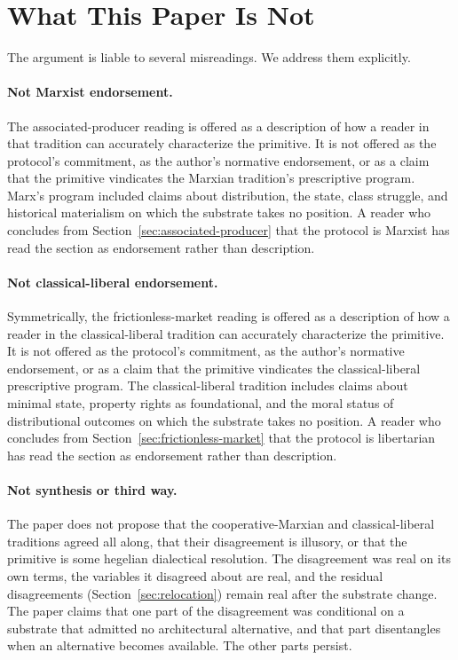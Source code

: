 \documentclass[11pt,a4paper]{article}
\theoremstyle{remark}
\begin{document}
\section{What This Paper Is Not}
\label{sec:not}

The argument is liable to several misreadings. We address them
explicitly.

\paragraph{Not Marxist endorsement.}
The associated-producer reading is offered as a description of
how a reader in that tradition can accurately characterize the
primitive. It is not offered as the protocol's commitment, as
the author's normative endorsement, or as a claim that the
primitive vindicates the Marxian tradition's prescriptive
program. Marx's program included claims about distribution, the
state, class struggle, and historical materialism on which the
substrate takes no position. A reader who concludes from
Section~\ref{sec:associated-producer} that the protocol is
Marxist has read the section as endorsement rather than
description.

\paragraph{Not classical-liberal endorsement.}
Symmetrically, the frictionless-market reading is offered as a
description of how a reader in the classical-liberal tradition
can accurately characterize the primitive. It is not offered as
the protocol's commitment, as the author's normative endorsement,
or as a claim that the primitive vindicates the classical-liberal
prescriptive program. The classical-liberal tradition includes
claims about minimal state, property rights as foundational, and
the moral status of distributional outcomes on which the
substrate takes no position. A reader who concludes from
Section~\ref{sec:frictionless-market} that the protocol is
libertarian has read the section as endorsement rather than
description.

\paragraph{Not synthesis or third way.}
The paper does not propose that the cooperative-Marxian and
classical-liberal traditions agreed all along, that their
disagreement is illusory, or that the primitive is some
hegelian dialectical resolution. The disagreement was real on
its own terms, the variables it disagreed about are real, and
the residual disagreements (Section~\ref{sec:relocation}) remain
real after the substrate change. The paper claims that one part
of the disagreement was conditional on a substrate that admitted
no architectural alternative, and that part disentangles when an
alternative becomes available. The other parts persist.
\end{document}
